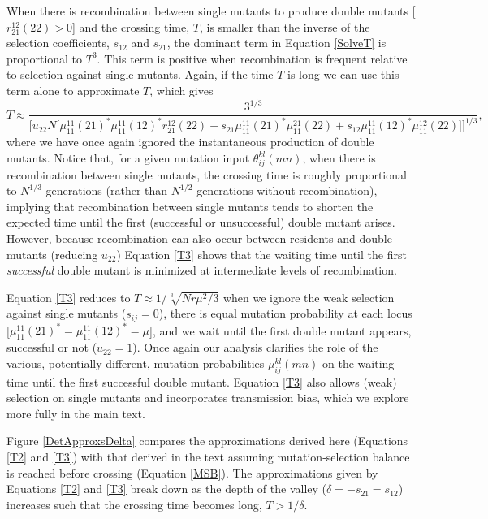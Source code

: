 \documentclass[review,3p,authoryear]{elsarticle}
\begin{document}
\begin{appendices}
When there is recombination between single mutants to produce double mutants [$r_{21}^{12}(22)>0$] and the crossing time, $T$, is smaller than the inverse of the selection coefficients, $s_{12}$ and $s_{21}$, the dominant term in Equation \eqref{SolveT} is proportional to $T^3$.
This term is positive when recombination is frequent relative to selection against single mutants. 
Again, if the time $T$ is long we can use this term alone to approximate $T$, which gives 
\begin{equation}\label{T3}
T \approx \frac{3^{1/3}} {\Big[ u_{22} N \big[ \mu_{11}^{11}(21)^* \mu_{11}^{11}(12)^* r_{21}^{12}(22) + s_{21} \mu_{11}^{11}(21)^* \mu_{11}^{21}(22) + s_{12} \mu_{11}^{11}(12)^* \mu_{11}^{12}(22) \big] \Big]^{1/3}},
\end{equation}
where we have once again ignored the instantaneous production of double mutants.
Notice that, for a given mutation input $\theta_{ij}^{kl}(mn)$, when there is recombination between single mutants, the crossing time is roughly proportional to $N^{1/3}$ generations (rather than $N^{1/2}$ generations without recombination), implying that recombination between single mutants tends to shorten the expected time until the first (successful or unsuccessful) double mutant arises.
However, because recombination can also occur between residents and double mutants (reducing $u_{22}$) Equation \eqref{T3} shows that the waiting time until the first \textit{successful} double mutant is minimized at intermediate levels of recombination. 

Equation \eqref{T3} reduces to $T\approx 1/\sqrt[3]{N r \mu^2/3}$ \citep[equation 9 in][]{Christiansen1998} when we ignore the weak selection against single mutants ($s_{ij}=0$), there is equal mutation probability at each locus [$\mu_{11}^{11}(21)^* = \mu_{11}^{11}(12)^*=\mu$], and we wait until the first double mutant appears, successful or not ($u_{22}=1$).
Once again our analysis clarifies the role of the various, potentially different, mutation probabilities $\mu_{ij}^{kl}(mn)$ on the waiting time until the first successful double mutant. 
Equation \eqref{T3} also allows (weak) selection on single mutants and incorporates transmission bias, which we explore more fully in the main text.

Figure \ref{DetApproxsDelta} compares the approximations derived here (Equations \ref{T2} and \ref{T3}) with that derived in the text assuming mutation-selection balance is reached before crossing (Equation \ref{MSB}).
The approximations given by Equations \eqref{T2} and \eqref{T3} break down as the depth of the valley ($\delta = -s_{21} = s_{12}$) increases such that the crossing time becomes long, $T>1/\delta$.


\end{appendices}
\end{document}
